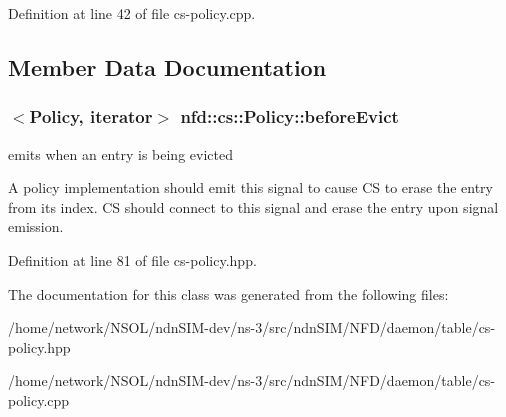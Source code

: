 Definition at line 42 of file cs-\/policy.\+cpp.



\subsection{Member Data Documentation}
\subsubsection[{\texorpdfstring{before\+Evict}{beforeEvict}}]{$<${\bf Policy}, iterator$>$ nfd\+::cs\+::\+Policy\+::before\+Evict}\hypertarget{classnfd_1_1cs_1_1Policy_a442af19fefa3fbe0267471117149c998}{}\label{classnfd_1_1cs_1_1Policy_a442af19fefa3fbe0267471117149c998}


emits when an entry is being evicted 

A policy implementation should emit this signal to cause CS to erase the entry from its index. CS should connect to this signal and erase the entry upon signal emission. 

Definition at line 81 of file cs-\/policy.\+hpp.



The documentation for this class was generated from the following files\+:\begin{DoxyCompactItemize}
\item 
/home/network/\+N\+S\+O\+L/ndn\+S\+I\+M-\/dev/ns-\/3/src/ndn\+S\+I\+M/\+N\+F\+D/daemon/table/cs-\/policy.\+hpp\item 
/home/network/\+N\+S\+O\+L/ndn\+S\+I\+M-\/dev/ns-\/3/src/ndn\+S\+I\+M/\+N\+F\+D/daemon/table/cs-\/policy.\+cpp\end{DoxyCompactItemize}
